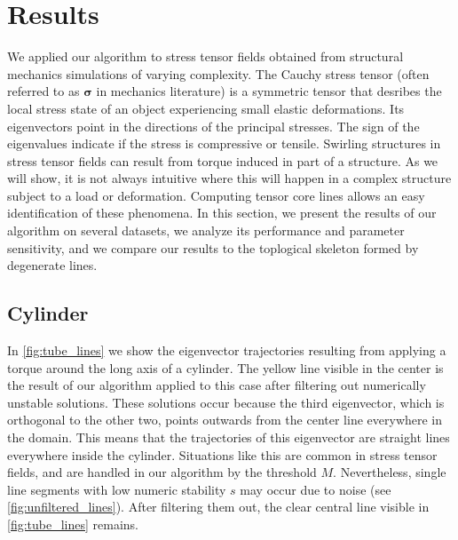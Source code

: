 
%
\section{Results} %
\label{sec:tcl_results}
%
We applied our algorithm to stress tensor fields obtained from structural
mechanics simulations of varying complexity.
%
The Cauchy stress tensor (often referred to as $\mathbf{\sigma}$ in mechanics
literature) is a symmetric tensor that desribes the local stress state of an
object experiencing small elastic deformations.
%
Its eigenvectors point in the directions of the principal stresses.
%
The sign of the eigenvalues indicate if the stress is compressive or tensile.
%
Swirling structures in stress tensor fields can result from torque induced in
part of a structure.
%
As we will show, it is not always intuitive where this will happen in a complex
structure subject to a load or deformation.
%
Computing tensor core lines allows an easy identification of these phenomena.
%
In this section, we present the results of our algorithm on several datasets, we
analyze its performance and parameter sensitivity, and we compare our results to
the toplogical skeleton formed by degenerate lines.
%
\subsection{Cylinder} %
\label{sub:torque_applied_to_a_cylinder}
%
In \cref{fig:tube_lines} we show the eigenvector trajectories resulting from
applying a torque around the long axis of a cylinder.
%
The yellow line visible in the center is the result of our algorithm applied to
this case after filtering out numerically unstable solutions.
%
These solutions occur because the third eigenvector, which is orthogonal to the
other two, points outwards from the center line everywhere in the domain.
%
This means that the trajectories of this eigenvector are straight lines
everywhere inside the cylinder.
%
Situations like this are common in stress tensor fields, and are handled in our
algorithm by the threshold $M$.
%
Nevertheless, single line segments with low numeric stability $s$ may occur due
to noise (see \cref{fig:unfiltered_lines}).
%
After filtering them out, the clear central line visible in
\cref{fig:tube_lines} remains.
%
%
